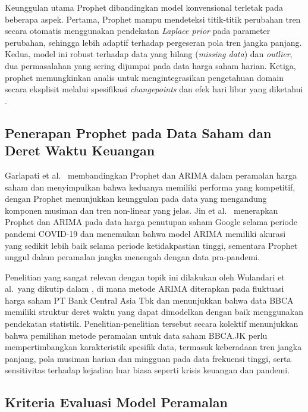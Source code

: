 \documentclass[11pt,twoside]{article}
\begin{document}
Keunggulan utama Prophet dibandingkan model konvensional terletak pada beberapa aspek.
Pertama, Prophet mampu mendeteksi titik-titik perubahan tren secara otomatis menggunakan
pendekatan \textit{Laplace prior} pada parameter perubahan, sehingga lebih adaptif terhadap
pergeseran pola tren jangka panjang. Kedua, model ini robust terhadap data yang hilang
(\textit{missing data}) dan \textit{outlier}, dua permasalahan yang sering dijumpai pada data
harga saham harian. Ketiga, prophet memungkinkan analis untuk mengintegrasikan pengetahuan
domain secara eksplisit melalui spesifikasi \textit{changepoints} dan efek hari libur yang
diketahui \cite{Taylor2018}.

\subsection{Penerapan Prophet pada Data Saham dan Deret Waktu Keuangan}

Garlapati et al.\ \cite{Garlapati2021} membandingkan Prophet dan ARIMA dalam peramalan
harga saham dan menyimpulkan bahwa keduanya memiliki performa yang kompetitif, dengan
Prophet menunjukkan keunggulan pada data yang mengandung komponen musiman dan tren
non-linear yang jelas. Jin et al.\ \cite{Jin2022} menerapkan Prophet dan ARIMA pada data
harga penutupan saham Google selama periode pandemi COVID-19 dan menemukan bahwa
model ARIMA memiliki akurasi yang sedikit lebih baik selama periode ketidakpastian tinggi,
sementara Prophet unggul dalam peramalan jangka menengah dengan data pra-pandemi.

Penelitian yang sangat relevan dengan topik ini dilakukan oleh Wulandari et al.\ yang dikutip
dalam \cite{Kurnia2025}, di mana metode ARIMA diterapkan pada fluktuasi harga saham
PT Bank Central Asia Tbk dan menunjukkan bahwa data BBCA memiliki struktur deret waktu
yang dapat dimodelkan dengan baik menggunakan pendekatan statistik. Penelitian-penelitian
tersebut secara kolektif menunjukkan bahwa pemilihan metode peramalan untuk data saham
BBCA.JK perlu mempertimbangkan karakteristik spesifik data, termasuk keberadaan tren jangka
panjang, pola musiman harian dan mingguan pada data frekuensi tinggi, serta sensitivitas
terhadap kejadian luar biasa seperti krisis keuangan dan pandemi.

\subsection{Kriteria Evaluasi Model Peramalan}
\end{document}
